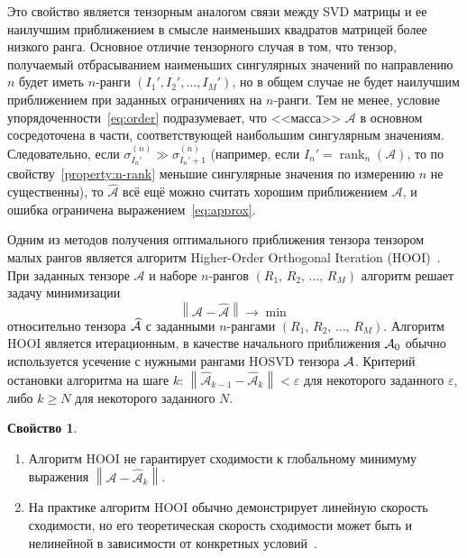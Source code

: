 \documentclass[specialist,
  substylefile = spbu.rtx,
subf,href,colorlinks=true, 12pt]{disser}
\theoremstyle{plain}
\theoremstyle{definition}
\newtheorem{property}{Свойство}[section]
\theoremstyle{remark}
\begin{document}
Это свойство является тензорным аналогом связи между SVD матрицы и ее
наилучшим приближением в смысле наименьших квадратов матрицей более
низкого ранга.
Основное отличие тензорного случая в том, что тензор, получаемый
отбрасыванием наименьших сингулярных значений по направлению $n$ будет иметь
$n$-ранги $(I_1', I_2', \ldots, I_M')$, но в общем случае не будет
наилучшим приближением при заданных ограничениях на $n$-ранги.
Тем не менее, условие упорядоченности~\eqref{eq:order} подразумевает,
что <<масса>> $\mathcal{A}$ в основном сосредоточена в части,
соответствующей наибольшим сингулярным значениям.
Следовательно, если $\sigma^{(n)}_{I_n'} \gg \sigma^{(n)}_{I_n'+1}$
(например, если $I_n'=\operatorname{rank}_n(\mathcal{A})$,
  то по свойству~\ref{property:n-rank} меньшие сингулярные значения по
измерению $n$ не существенны), то
$\widehat{\mathcal{A}}$ всё ещё можно считать хорошим приближением
$\mathcal{A}$, и ошибка ограничена выражением~\eqref{eq:approx}.

Одним из методов получения оптимального приближения тензора тензором
малых рангов является алгоритм
Higher-Order Orthogonal Iteration (HOOI)~\cite{hooi, hooi-alg}.
При заданных тензоре $\mathcal{A}$ и наборе $n$-рангов $(R_1,\,
R_2,\, \ldots,\, R_M)$
алгоритм решает задачу минимизации
\[
  \left\|\mathcal{A}-\widehat{\mathcal{A}}\right\|\to \min
\]
относительно тензора $\widehat{\mathcal{A}}$ с заданными $n$-рангами
$(R_1,\, R_2,\, \ldots,\, R_M)$.
Алгоритм HOOI является итерационным, в качестве начального
приближения $\mathcal{A}_0$ обычно используется
усечение с нужными рангами HOSVD тензора $\mathcal{A}$.
Критерий остановки алгоритма на шаге $k$:
$\left\|\widehat{\mathcal{A}}_{k-1}-\widehat{\mathcal{A}}_k\right\| <
\varepsilon$
для некоторого заданного $\varepsilon$, либо $k \geqslant N$ для
некоторого заданного $N$.
\begin{property}
  \label{property:hooi-properties}
  \leavevmode
  \begin{enumerate}
    \item Алгоритм HOOI не гарантирует сходимости к глобальному
      минимуму выражения
      $\left\|\mathcal{A}-\widehat{\mathcal{A}}_k\right\|$.
    \item На практике алгоритм HOOI обычно демонстрирует линейную
      скорость сходимости, но его теоретическая скорость сходимости
      может быть и нелинейной в зависимости от конкретных
      условий~\cite{hooi-convergence}.
  \end{enumerate}
\end{property}
\end{document}
